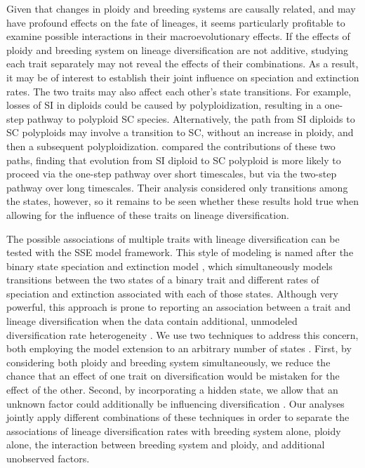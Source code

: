 Given that changes in ploidy and breeding systems are causally related, and may have profound effects on the fate of lineages, it seems particularly profitable to examine possible interactions in their macroevolutionary effects.
If the effects of ploidy and breeding system on lineage diversification are not additive, studying each trait separately may not reveal the effects of their combinations.
As a result, it may be of interest to establish their joint influence on speciation and extinction rates.
The two traits may also affect each other's state transitions.
For example, losses of SI in diploids could be caused by polyploidization, resulting in a one-step pathway to polyploid SC species. 
Alternatively, the path from SI diploids to SC polyploids may involve a transition to SC, without an increase in ploidy, and then a subsequent polyploidization. 
\citet{robertson_2011} compared the contributions of these two paths, finding that evolution from SI diploid to SC polyploid is more likely to proceed via the one-step pathway over short timescales, but via the two-step pathway over long timescales.
Their analysis considered only transitions among the states, however, so it remains to be seen whether these results hold true when allowing for the influence of these traits on lineage diversification.

The possible associations of multiple traits with lineage diversification can be tested with the SSE model framework.
This style of modeling is named after the binary state speciation and extinction model \citep[BiSSE; ][]{maddison_2007}, which simultaneously models transitions between the two states of a binary trait and different rates of speciation and extinction associated with each of those states.
Although very powerful, this approach is prone to reporting an association between a trait and lineage diversification when the data contain additional, unmodeled diversification rate heterogeneity \citep{rabosky_2015}.
We use two techniques to address this concern, both employing the model extension to an arbitrary number of states \citep[MuSSE][]{fitzjohn_2012}.
First, by considering both ploidy and breeding system simultaneously, we reduce the chance that an effect of one trait on diversification would be mistaken for the effect of the other.
Second, by incorporating a hidden state, we allow that an unknown factor could additionally be influencing diversification \citep[HiSSE][]{beaulieu_2016}.
Our analyses jointly apply different combinations of these techniques in order to separate the associations of lineage diversification rates with breeding system alone, ploidy alone, the interaction between breeding system and ploidy, and additional unobserved factors.

